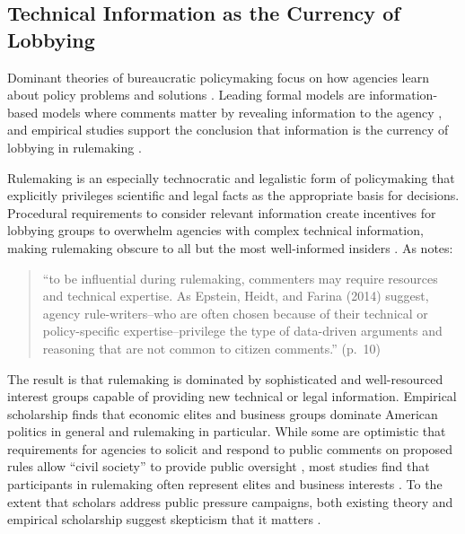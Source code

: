 \documentclass[
      12pt,
        ]{article}
\begin{document}
\hypertarget{technical-information-as-the-currency-of-lobbying}{%
\subsection{Technical Information as the Currency of Lobbying}\label{technical-information-as-the-currency-of-lobbying}}

Dominant theories of bureaucratic policymaking focus on how agencies learn about policy problems and solutions \citep{Kerwin2011}. Leading formal models are information-based models where comments matter by revealing information to the agency \citep{Gailmard2017, Libgober2018}, and empirical studies support the conclusion that information is the currency of lobbying in rulemaking \citep{Yackee2012, Cook2017, Gordon2018, Walters2019}.

Rulemaking is an especially technocratic and legalistic form of policymaking that explicitly privileges scientific and legal facts as the appropriate basis for decisions. Procedural requirements to consider relevant information create incentives for lobbying groups to overwhelm agencies with complex technical information, making rulemaking obscure to all but the most well-informed insiders \citep{Wagner2010}.
As \citet{Yackee2019} notes:

\begin{quote}
``to be influential during rulemaking,
commenters may require resources and technical expertise.
As Epstein, Heidt, and Farina (2014) suggest, agency rule-writers--who are often chosen because
of their technical or policy-specific expertise--privilege the type of data-driven
arguments and reasoning that are not common to citizen comments.'' (p.~10)
\end{quote}

The result is that rulemaking is dominated by sophisticated and well-resourced interest groups capable of providing new technical or legal information. Empirical scholarship finds that economic elites and business groups
dominate American politics in general \citetext{\citealp{Jacobs2005}; \citealp{Soss2007}; \citealp[Hertel-Fernandez2019;][]{Hacker2003}; \citealp{Gilens2014}} and rulemaking in
particular. While some are optimistic that requirements for agencies to
solicit and respond to public comments on proposed rules allow ``civil
society'' to provide public oversight \citep{Michaels2015, Metzger2010}, most
studies find that participants in rulemaking often represent elites and
business interests \citep{Seifter2016UCLA, Crow2015, Wagner2011, West2009, Yackee2006JOP, Yackee2006JPART, Golden1998, Haeder2015, Cook2017, LibgoberCarpenter2018}. To the extent that scholars address public pressure campaigns, both
existing theory and empirical scholarship suggest skepticism that it
matters \citep{Balla2018}.
\end{document}
